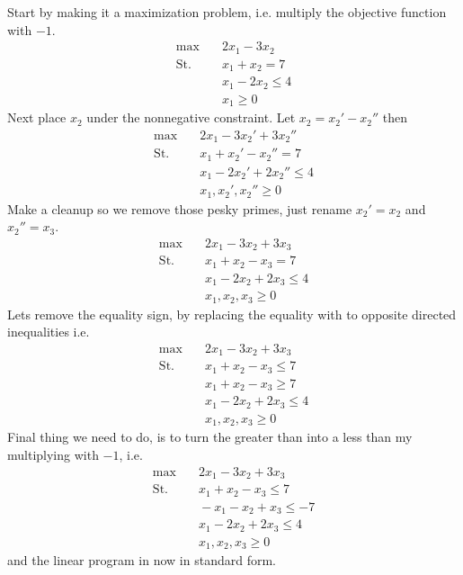 \documentclass[10pt]{article}
\begin{document}
Start by making it a maximization problem, i.e. multiply the objective function with $-1$.
\begin{align*}
 \max &\quad 2x_1 - 3x_2  \\ 
 \text{St.} &\quad  x_1 + x_2  = 7 \\
            &\quad  x_1 - 2x_2 \leq 4 \\
            &\quad  x_1        \geq 0  
\end{align*}
Next place $x_2$ under the nonnegative constraint. Let $x_2 = x_2'-x_2''$ then
\begin{align*}
 \max &\quad 2x_1 - 3x_2' +3x_2''  \\ 
 \text{St.} &\quad  x_1 + x_2'-x_2''  = 7 \\
            &\quad  x_1 - 2x_2' +2x_2'' \leq 4 \\
            &\quad  x_1, x_2', x_2''    \geq 0  
\end{align*}
Make a cleanup so we remove those pesky primes, just rename $x_2' = x_2$ and $x_2'' = x_3$.
\begin{align*}
 \max &\quad 2x_1 - 3x_2 +3x_3  \\ 
 \text{St.} &\quad  x_1 + x_2-x_3  = 7 \\
            &\quad  x_1 - 2x_2 +2x_3 \leq 4 \\
            &\quad  x_1, x_2, x_3    \geq 0  
\end{align*}
Lets remove the equality sign, by replacing the equality with to opposite directed inequalities i.e.
\begin{align*}
 \max &\quad 2x_1 - 3x_2 +3x_3  \\ 
 \text{St.} &\quad  x_1 + x_2-x_3  \leq 7 \\
            &\quad  x_1 + x_2-x_3  \geq 7 \\
            &\quad  x_1 - 2x_2 +2x_3 \leq 4 \\
            &\quad  x_1, x_2, x_3    \geq 0  
\end{align*}
Final thing we need to do, is to turn the greater than into a less than my multiplying with $-1$, i.e.
\begin{align}
 \max &\quad 2x_1 - 3x_2 +3x_3  \label{linprop2}\\ 
 \text{St.} &\quad  x_1 + x_2-x_3  \leq 7 \nonumber\\
            &\quad  -x_1 - x_2 + x_3  \leq -7 \nonumber\\
            &\quad  x_1 - 2x_2 +2x_3 \leq 4 \nonumber\\
            &\quad  x_1, x_2, x_3    \geq 0  
\end{align}
and the linear program in now in standard form.
\end{document}
